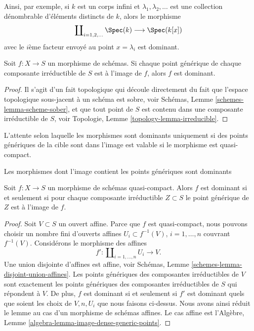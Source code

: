 \noindent
Ainsi, par exemple, si $k$ est un corps infini et $\lambda_1, \lambda_2, \ldots$ est une collection
dénombrable d'éléments distincts de $k$, alors le morphisme
$$
\coprod\nolimits_{i = 1, 2, \ldots } \Spec(k)
\longrightarrow
\Spec(k[x])
$$
avec le $i$ème facteur envoyé au point $x = \lambda_i$ est dominant.

\begin{lemma}
\label{lemma-generic-points-in-image-dominant}
Soit $f : X \to S$ un morphisme de schémas. Si chaque
point générique de chaque composante irréductible de $S$ est à l'image
de $f$, alors $f$ est dominant.
\end{lemma}

\begin{proof}
Il s'agit d'un fait topologique qui découle directement du fait
que l'espace topologique sous-jacent à un schéma est
sobre, voir Schémas, Lemme \ref{schemes-lemma-scheme-sober}, et que tout point
de $S$ est contenu dans une composante irréductible
de $S$, voir Topologie, Lemme \ref{topology-lemma-irreducible}.
\end{proof}

\noindent
L'attente selon laquelle les morphismes sont dominants uniquement si des points génériques
de la cible sont dans l'image est valable si le morphisme est quasi-compact.

\begin{lemma}
\label{lemma-quasi-compact-dominant}
\begin{slogan}
Les morphismes dont l'image contient les points génériques sont dominants
\end{slogan}
Soit $f : X \to S$ un morphisme de schémas quasi-compact. Alors $f$
est dominant si et seulement si pour chaque composante irréductible
$Z \subset S$ le point générique de $Z$ est à l'image de
$f$.
\end{lemma}

\begin{proof}
Soit $V \subset S$ un ouvert affine. Parce
que $f$ est quasi-compact, nous pouvons choisir un nombre
fini d'ouverts affines $U_i \subset f^{-1}(V)$, $i = 1, \ldots, n$ couvrant $f^{-1}(V)$.
Considérons le morphisme des affines
$$
f' :
\coprod\nolimits_{i = 1, \ldots, n} U_i
\longrightarrow
V.
$$
Une union disjointe d'affines est affine, voir
Schémas, Lemme \ref{schemes-lemma-disjoint-union-affines}. Les points génériques des composantes
irréductibles de $V$ sont exactement
les points génériques des composantes irréductibles de $S$ qui
répondent à $V$. De plus, $f$ est dominant si et seulement
si $f'$ est dominant quels que soient les choix de $V, n, U_i$
que nous faisons ci-dessus. Nous avons ainsi réduit le lemme au cas
d'un morphisme de
schémas affines. Le cas affine est l'Algèbre, Lemme \ref{algebra-lemma-image-dense-generic-points}.
\end{proof}


